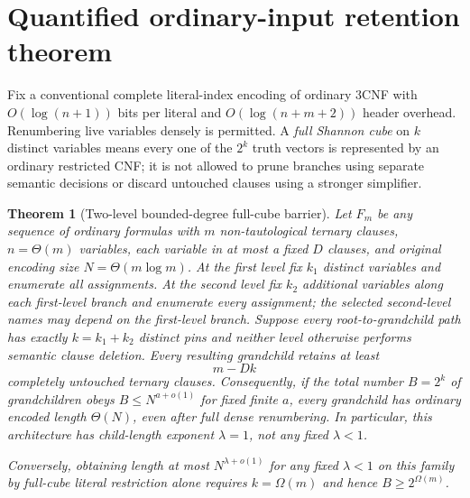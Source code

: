 \documentclass[11pt]{article}
\newtheorem{theorem}{Theorem}
\begin{document}
\section{Quantified ordinary-input retention theorem}
Fix a conventional complete literal-index encoding of ordinary 3CNF with
$O(\log(n+1))$ bits per literal and $O(\log(n+m+2))$ header overhead. Renumbering live variables densely is permitted. A \emph{full Shannon cube} on $k$ distinct variables means every one of the $2^k$ truth vectors is represented by an ordinary restricted CNF; it is not allowed to prune branches using separate semantic decisions or discard untouched clauses using a stronger simplifier.

\begin{theorem}[Two-level bounded-degree full-cube barrier]\label{th:retain}
Let $F_m$ be any sequence of ordinary formulas with $m$ non-tautological ternary clauses, $n=\Theta(m)$ variables, each variable in at most a fixed $D$ clauses, and original encoding size $N=\Theta(m\log m)$. At the first level fix $k_1$ distinct variables and enumerate all assignments. At the second level fix $k_2$ additional variables along each first-level branch and enumerate every assignment; the selected second-level names may depend on the first-level branch. Suppose every root-to-grandchild path has exactly $k=k_1+k_2$ distinct pins and neither level otherwise performs semantic clause deletion. Every resulting grandchild retains at least
\[
m-Dk
\]
completely untouched ternary clauses. Consequently, if the total number $B=2^k$ of grandchildren obeys $B\le N^{a+o(1)}$ for fixed finite $a$, every grandchild has ordinary encoded length $\Theta(N)$, even after full dense renumbering. In particular, this architecture has child-length exponent $\lambda=1$, not any fixed $\lambda<1$.

Conversely, obtaining length at most $N^{\lambda+o(1)}$ for any fixed $\lambda<1$ on this family by \emph{full-cube literal restriction alone} requires $k=\Omega(m)$ and hence $B\ge2^{\Omega(m)}$.
\end{theorem}
\end{document}
